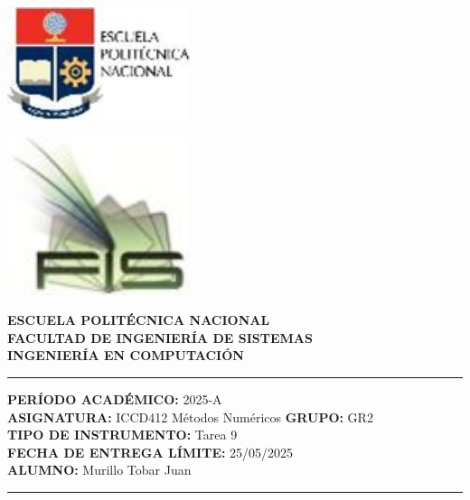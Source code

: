 \documentclass[12pt]{article}
\begin{document}
\begin{minipage}{0.45\textwidth}
    \includegraphics[width=0.4\textwidth]{inFiles/Figures/epnLogo.jpg}
\end{minipage}
\hfill
\begin{minipage}{0.45\textwidth}
    \raggedleft
    \includegraphics[width=0.4\textwidth]{inFiles/Figures/FIS_logo.jpg}
\end{minipage}

\vspace{0.5cm}

\begin{center}
    \textbf{ESCUELA POLITÉCNICA NACIONAL}\\[0.2cm]
    \textbf{FACULTAD DE INGENIERÍA DE SISTEMAS}\\[0.2cm]
    \textbf{INGENIERÍA {\textbf{EN COMPUTACIÓN}}}
\end{center}

\vspace{0.5cm}
\hrule
\vspace{0.5cm}

\noindent\textbf{PERÍODO ACADÉMICO:} 2025-A\\[0.2cm]
\noindent\textbf{ASIGNATURA:} ICCD412 Métodos Numéricos \hfill \textbf{GRUPO:} GR2\\[0.2cm]
\noindent\textbf{TIPO DE INSTRUMENTO:} Tarea 9\\[0.2cm]
\noindent\textbf{FECHA DE ENTREGA LÍMITE:} 25/05/2025\\[0.2cm]
\noindent\textbf{ALUMNO:} Murillo Tobar Juan

\vspace{0.5cm}
\hrule
\vspace{1cm}
\end{document}
